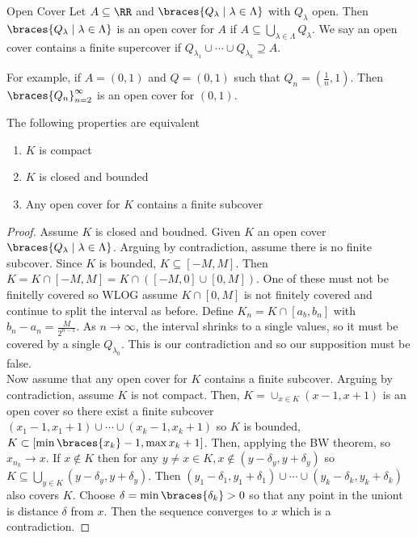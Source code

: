 \begin{defbox}{Open Cover}{}
    Let $A \subseteq \RR$ and $\braces{Q_{\lambda} \mid \lambda \in \Lambda}$ with $Q_\lambda$ open. Then $\braces{Q_\lambda \mid \lambda \in \Lambda}$ is an open cover for $A$ if $A \subseteq \bigcup_{\lambda \in \Lambda} Q_{\lambda}$. We say an open cover contains a finite supercover if $Q_{\lambda_1} \cup \cdots \cup Q_{\lambda_{k}} \supseteq A$.
\end{defbox}

For example, if $A = (0, 1)$ and $Q = (0, 1)$ such that $Q_n = \left(\frac{1}{n}, 1\right)$. Then $\braces{Q_n}_{n=2}^\infty$ is an open cover for $(0, 1)$.

\begin{thm}{}
    The following properties are equivalent
    \begin{enumerate}
        \item $K$ is compact
        \item $K$ is closed and bounded
        \item Any open cover for $K$ contains a finite subcover
    \end{enumerate}

    \begin{proof}
        Assume $K$ is closed and boudned. Given $K$ an open cover $\braces{Q_\lambda \mid \lambda \in \Lambda}$. Arguing by contradiction, assume there is no finite subcover. Since $K$ is bounded, $K \subseteq [-M, M]$. Then $K = K \cap [-M, M] = K \cap ([-M, 0] \cup [0, M])$. One of these must not be finitelly covered so WLOG assume $K \cap [0, M]$ is not finitely covered and continue to split the interval as before. Define $K_n = K \cap [a_b, b_n]$ with $b_n - a_n = \frac{M}{2^{n-1}}$. As $n \to \infty$, the interval shrinks to a single values, so it must be covered by a single $Q_{\lambda_0}$. This is our contradiction and so our supposition must be false. \\
        Now assume that any open cover for $K$ contains a finite subcover. Arguing by contradiction, assume $K$ is not compact. Then, $K = \cup_{x \in K} (x - 1, x + 1)$ is an open cover so there exist a finite subcover $(x_1 - 1, x_1 + 1) \cup \cdots \cup (x_k - 1, x_k + 1)$ so $K$ is bounded, $K \subset [\min\braces{x_k} - 1, \max{x_k} + 1]$. Then, applying the BW theorem, so $x_{n_k} \to x$. If $x \not\in K$ then for any $y \neq x \in K, x \not\in (y - \delta_y, y + \delta_y)$ so $K \subseteq \bigcup_{y \in K} (y - \delta_y, y + \delta_y)$. Then $(y_1 - \delta_1, y_1 + \delta_1) \cup \cdots \cup (y_k - \delta_k, y_k + \delta_k)$ also covers $K$. Choose $\delta = \min\braces{\delta_k} > 0$ so that any point in the uniont is distance $\delta$ from $x$. Then the sequence converges to $x$ which is a contradiction. 
    \end{proof}
\end{thm}

